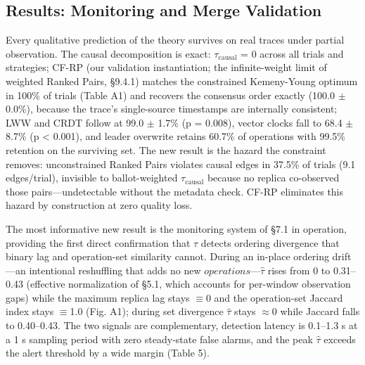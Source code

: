 \documentclass[journal]{IEEEtran}
\begin{document}
\subsection{Results: Monitoring and Merge Validation}
Every qualitative prediction of the theory survives on real traces under partial observation. The causal decomposition is exact: $\tau_{\mathrm{causal}}$ = 0 across all trials and strategies; CF-RP (our validation instantiation; the infinite-weight limit of weighted Ranked Pairs, §9.4.1) matches the constrained Kemeny-Young optimum in 100\% of trials (Table A1) and recovers the consensus order exactly (100.0 $\pm$ 0.0\%), because the trace's single-source timestamps are internally consistent; LWW and CRDT follow at 99.0 $\pm$ 1.7\% (p = 0.008), vector clocks fall to 68.4 $\pm$ 8.7\% (p < 0.001), and leader overwrite retains 60.7\% of operations with 99.5\% retention on the surviving set. The new result is the hazard the constraint removes: unconstrained Ranked Pairs violates causal edges in 37.5\% of trials (9.1 edges/trial), invisible to ballot-weighted $\tau_{\mathrm{causal}}$ because no replica co-observed those pairs—undetectable without the metadata check. CF-RP eliminates this hazard by construction at zero quality loss.

The most informative new result is the monitoring system of §7.1 in operation, providing the first direct confirmation that $\tau$ detects ordering divergence that binary lag and operation-set similarity cannot. During an in-place ordering drift—an intentional reshuffling that adds no new $operations—\hat{\tau}$ rises from 0 to 0.31–0.43 (effective normalization of §5.1, which accounts for per-window observation gaps) while the maximum replica lag stays $\equiv$0 and the operation-set Jaccard index stays $\equiv$1.0 (Fig. A1); during set divergence $\hat{\tau}$ stays $\approx$0 while Jaccard falls to 0.40–0.43. The two signals are complementary, detection latency is 0.1–1.3 s at a 1 s sampling period with zero steady-state false alarms, and the peak $\hat{\tau}$ exceeds the alert threshold by a wide margin (Table 5).
\end{document}
